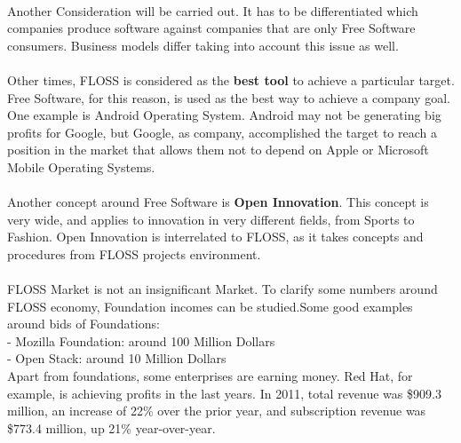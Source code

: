 \\
Another Consideration will be carried out. It has to be differentiated which companies produce software against companies that are only Free Software consumers. Business models differ taking into account this issue as well.\\
\\
Other times, FLOSS is considered as the \textbf{best tool} to achieve a particular target. Free Software, for this reason,  is used as the best way to achieve a company goal. One example is Android Operating System. Android may not be generating big profits for Google, but Google, as company, accomplished the target to reach a position in the market that allows them not to depend on Apple or Microsoft Mobile Operating Systems.\\
\\
Another concept around Free Software is \textbf{Open Innovation}. This concept is very wide, and applies to innovation in very different fields, from Sports to Fashion. Open Innovation is interrelated to FLOSS, as it takes concepts and procedures from FLOSS projects environment.\\
\\
FLOSS Market is not an insignificant Market. To clarify some numbers around FLOSS economy, Foundation incomes can be studied.Some good examples around bids of Foundations:\\
- Mozilla Foundation: around 100 Million Dollars\\
- Open Stack: around 10 Million Dollars\\
Apart from foundations, some enterprises are earning money. Red Hat, for example, is achieving profits in the last years. In 2011, total revenue was \$909.3 million, an increase of 22\% over the prior year, and subscription revenue was \$773.4 million, up 21\% year-over-year. 
\\
